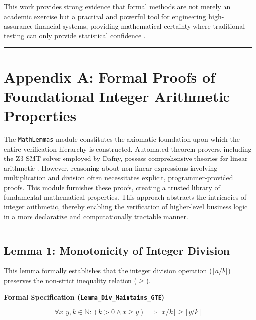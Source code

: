 \documentclass[
  english,
  onecolumn]{article}
\begin{document}
This work provides strong evidence that formal methods are not merely an
academic exercise but a practical and powerful tool for engineering
high-assurance financial systems, providing mathematical certainty where
traditional testing can only provide statistical confidence
\citep{woodcock2009formal, jovanovic2021foundations}.

\begin{center}\rule{0.5\linewidth}{0.5pt}\end{center}

\section{Appendix A: Formal Proofs of Foundational Integer Arithmetic
Properties}\label{appendix-a-formal-proofs-of-foundational-integer-arithmetic-properties}

The \texttt{MathLemmas} module constitutes the axiomatic foundation upon
which the entire verification hierarchy is constructed. Automated
theorem provers, including the Z3 SMT solver employed by Dafny, possess
comprehensive theories for linear arithmetic
\citep{kroening2016decision}. However, reasoning about non-linear
expressions involving multiplication and division often necessitates
explicit, programmer-provided proofs. This module furnishes these
proofs, creating a trusted library of fundamental mathematical
properties. This approach abstracts the intricacies of integer
arithmetic, thereby enabling the verification of higher-level business
logic in a more declarative and computationally tractable manner.

\begin{center}\rule{0.5\linewidth}{0.5pt}\end{center}

\subsection{\texorpdfstring{\textbf{Lemma 1: Monotonicity of Integer
Division}}{Lemma 1: Monotonicity of Integer Division}}\label{lemma-1-monotonicity-of-integer-division}

This lemma formally establishes that the integer division operation
(\(\lfloor a/b \rfloor\)) preserves the non-strict inequality relation
(\(\ge\)).

\textbf{Formal Specification (\texttt{Lemma\_Div\_Maintains\_GTE})}

\[
\forall x, y, k \in \mathbb{N} : (k > 0 \land x \ge y) \implies \lfloor x/k \rfloor \ge \lfloor y/k \rfloor
\]
\end{document}
